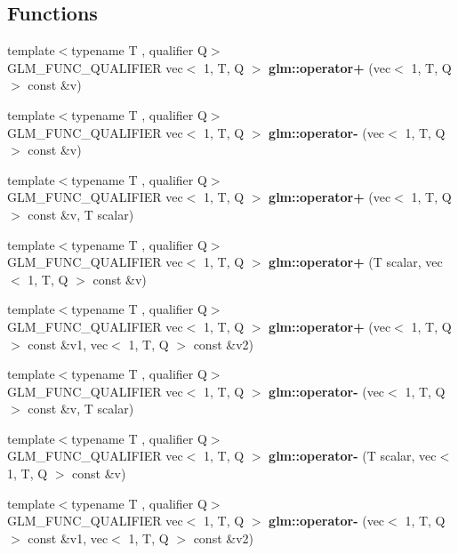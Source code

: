 \subsection*{Functions}
\begin{DoxyCompactItemize}
\item 
{\footnotesize template$<$typename T , qualifier Q$>$ }\\G\+L\+M\+\_\+\+F\+U\+N\+C\+\_\+\+Q\+U\+A\+L\+I\+F\+I\+ER vec$<$ 1, T, Q $>$ {\bfseries glm\+::operator+} (vec$<$ 1, T, Q $>$ const \&v)
\item 
{\footnotesize template$<$typename T , qualifier Q$>$ }\\G\+L\+M\+\_\+\+F\+U\+N\+C\+\_\+\+Q\+U\+A\+L\+I\+F\+I\+ER vec$<$ 1, T, Q $>$ {\bfseries glm\+::operator-\/} (vec$<$ 1, T, Q $>$ const \&v)
\item 
{\footnotesize template$<$typename T , qualifier Q$>$ }\\G\+L\+M\+\_\+\+F\+U\+N\+C\+\_\+\+Q\+U\+A\+L\+I\+F\+I\+ER vec$<$ 1, T, Q $>$ {\bfseries glm\+::operator+} (vec$<$ 1, T, Q $>$ const \&v, T scalar)
\item 
{\footnotesize template$<$typename T , qualifier Q$>$ }\\G\+L\+M\+\_\+\+F\+U\+N\+C\+\_\+\+Q\+U\+A\+L\+I\+F\+I\+ER vec$<$ 1, T, Q $>$ {\bfseries glm\+::operator+} (T scalar, vec$<$ 1, T, Q $>$ const \&v)
\item 
{\footnotesize template$<$typename T , qualifier Q$>$ }\\G\+L\+M\+\_\+\+F\+U\+N\+C\+\_\+\+Q\+U\+A\+L\+I\+F\+I\+ER vec$<$ 1, T, Q $>$ {\bfseries glm\+::operator+} (vec$<$ 1, T, Q $>$ const \&v1, vec$<$ 1, T, Q $>$ const \&v2)
\item 
{\footnotesize template$<$typename T , qualifier Q$>$ }\\G\+L\+M\+\_\+\+F\+U\+N\+C\+\_\+\+Q\+U\+A\+L\+I\+F\+I\+ER vec$<$ 1, T, Q $>$ {\bfseries glm\+::operator-\/} (vec$<$ 1, T, Q $>$ const \&v, T scalar)
\item 
{\footnotesize template$<$typename T , qualifier Q$>$ }\\G\+L\+M\+\_\+\+F\+U\+N\+C\+\_\+\+Q\+U\+A\+L\+I\+F\+I\+ER vec$<$ 1, T, Q $>$ {\bfseries glm\+::operator-\/} (T scalar, vec$<$ 1, T, Q $>$ const \&v)
\item 
{\footnotesize template$<$typename T , qualifier Q$>$ }\\G\+L\+M\+\_\+\+F\+U\+N\+C\+\_\+\+Q\+U\+A\+L\+I\+F\+I\+ER vec$<$ 1, T, Q $>$ {\bfseries glm\+::operator-\/} (vec$<$ 1, T, Q $>$ const \&v1, vec$<$ 1, T, Q $>$ const \&v2)

\end{DoxyCompactItemize}
